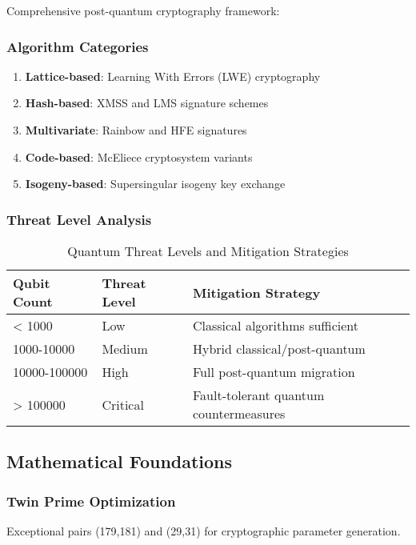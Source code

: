 \documentclass[11pt,a4paper]{article}
\begin{document}
Comprehensive post-quantum cryptography framework:

\subsubsection{Algorithm Categories}
\begin{enumerate}
    \item \textbf{Lattice-based}: Learning With Errors (LWE) cryptography
    \item \textbf{Hash-based}: XMSS and LMS signature schemes
    \item \textbf{Multivariate}: Rainbow and HFE signatures
    \item \textbf{Code-based}: McEliece cryptosystem variants
    \item \textbf{Isogeny-based}: Supersingular isogeny key exchange
\end{enumerate}

\subsubsection{Threat Level Analysis}
\begin{table}[H]
\centering
\caption{Quantum Threat Levels and Mitigation Strategies}
\label{tab:quantum_threats}
\begin{tabular}{@{}lll@{}}
\toprule
Qubit Count & Threat Level & Mitigation Strategy \\
\midrule
< 1000 & Low & Classical algorithms sufficient \\
1000-10000 & Medium & Hybrid classical/post-quantum \\
10000-100000 & High & Full post-quantum migration \\
> 100000 & Critical & Fault-tolerant quantum countermeasures \\
\bottomrule
\end{tabular}
\end{table}

\subsection{Mathematical Foundations}

\subsubsection{Twin Prime Optimization}
Exceptional pairs (179,181) and (29,31) for cryptographic parameter generation.
\end{document}
